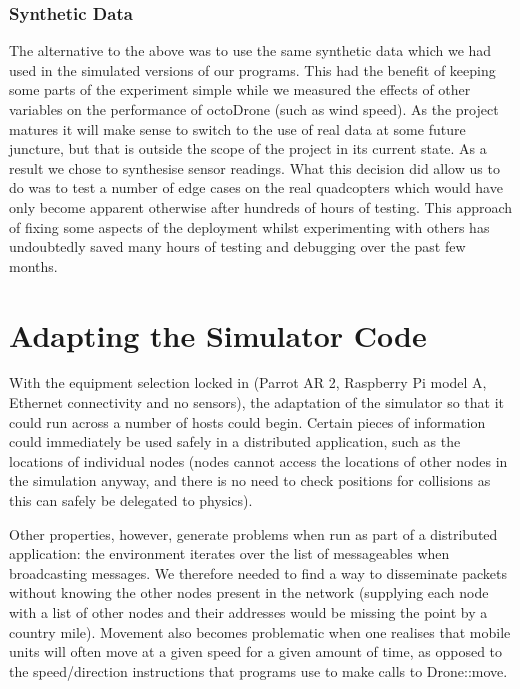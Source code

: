 \subsubsection{Synthetic Data}
The alternative to the above was to use the same synthetic data which we had used in the simulated versions of our programs. This had the benefit of keeping some parts of the experiment simple while we measured the effects of other variables on the performance of octoDrone (such as wind speed). As the project matures it will make sense to switch to the use of real data at some future juncture, but that is outside the scope of the project in its current state. As a result we chose to synthesise sensor readings. What this decision did allow us to do was to test a number of edge cases on the real quadcopters which would have only become apparent otherwise after hundreds of hours of testing. This approach of fixing some aspects of the deployment whilst experimenting with others has undoubtedly saved many hours of testing and debugging over the past few months.

\section{Adapting the Simulator Code}
With the equipment selection locked in (Parrot AR 2, Raspberry Pi model A, Ethernet connectivity and no sensors), the adaptation of the simulator so that it could run across a number of hosts could begin. Certain pieces of information could immediately be used safely in a distributed application, such as the locations of individual nodes (nodes cannot access the locations of other nodes in the simulation anyway, and there is no need to check positions for collisions as this can safely be delegated to physics).

Other properties, however, generate problems when run as part of a distributed application: the environment iterates over the list of messageables when broadcasting messages. We therefore needed to find a way to disseminate packets without knowing the other nodes present in the network (supplying each node with a list of other nodes and their addresses would be missing the point by a country mile). Movement also becomes problematic when one realises that mobile units will often move at a given speed for a given amount of time, as opposed to the speed/direction instructions that programs use to make calls to Drone::move.

